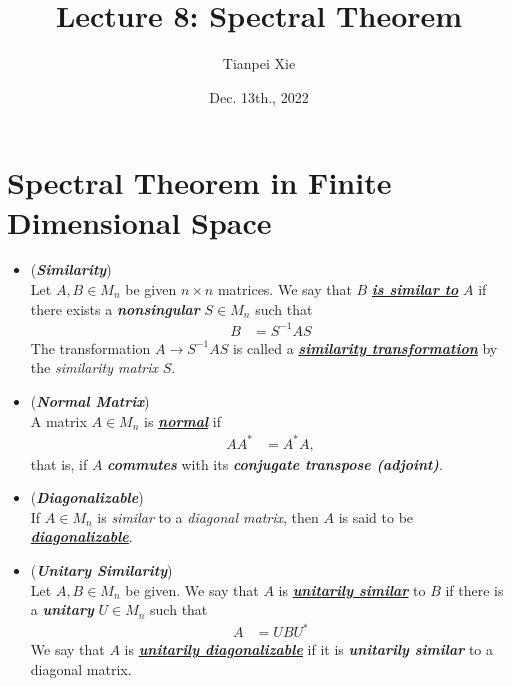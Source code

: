 \documentclass[11pt]{article}
\begin{document}
\title{Lecture 8: Spectral Theorem}
\author{ Tianpei Xie}
\date{ Dec. 13th., 2022 }
\maketitle
\tableofcontents
\newpage
\section{Spectral Theorem in Finite Dimensional Space}
\begin{itemize}
\item \begin{definition} (\emph{\textbf{Similarity}}) \citep{horn2012matrix}\\
Let $A, B \in M_n$ be given $n\times n$ matrices. We say that $B$ \underline{\emph{\textbf{is similar to}}} $A$ if there exists a \emph{\textbf{nonsingular}} $S \in M_n$ such that
\begin{align*}
B &= S^{-1}A S
\end{align*}
The transformation $A \to S^{-1} A S$ is called a \underline{\emph{\textbf{similarity transformation}}} by the \emph{similarity matrix} $S$.
\end{definition}



\item \begin{definition}  (\emph{\textbf{Normal Matrix}}) \citep{horn2012matrix}\\
A matrix  $A \in M_n$ is \underline{\emph{\textbf{normal}}} if
\begin{align*}
A A^{*} &= A^{*} A,
\end{align*} that is, if $A$ \emph{\textbf{commutes}} with its \emph{\textbf{conjugate transpose (adjoint)}}.
\end{definition}

\item \begin{definition} (\emph{\textbf{Diagonalizable}}) \citep{horn2012matrix}\\
If $A \in M_n$ is \emph{similar} to a \emph{diagonal matrix}, then $A$ is said to be \underline{\emph{\textbf{diagonalizable}}}.
\end{definition}

\item \begin{definition} (\emph{\textbf{Unitary Similarity}}) \citep{horn2012matrix}\\
Let $A, B \in M_n$ be given. We say that $A$ is  \underline{\emph{\textbf{unitarily similar}}} to $B$ if there is a \emph{\textbf{unitary}} $U \in M_n$ such that
\begin{align*}
A &= U B U^{*} 
\end{align*} We say that $A$ is \underline{\emph{\textbf{unitarily diagonalizable}}} if it is \textbf{\emph{unitarily similar}} to a diagonal matrix.


\end{definition}
\end{itemize}
\end{document}
